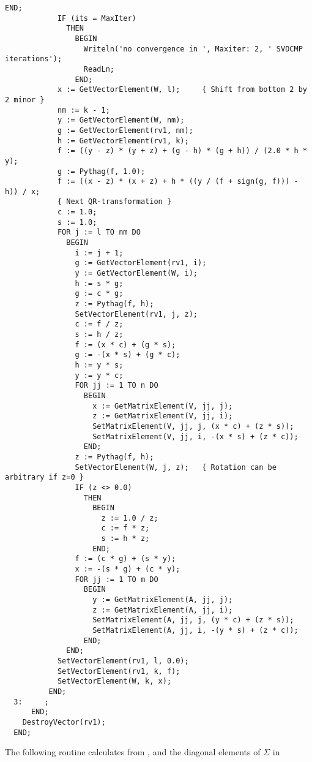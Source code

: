 \begin{lstlisting}[caption=Singular value decomposition]
                END;
            IF (its = MaxIter)
              THEN
                BEGIN
                  Writeln('no convergence in ', Maxiter: 2, ' SVDCMP iterations');
                  ReadLn;
                END;
            x := GetVectorElement(W, l);     { Shift from bottom 2 by 2 minor }
            nm := k - 1;
            y := GetVectorElement(W, nm);
            g := GetVectorElement(rv1, nm);
            h := GetVectorElement(rv1, k);
            f := ((y - z) * (y + z) + (g - h) * (g + h)) / (2.0 * h * y);
            g := Pythag(f, 1.0);
            f := ((x - z) * (x + z) + h * ((y / (f + sign(g, f))) - h)) / x;
            { Next QR-transformation }
            c := 1.0;
            s := 1.0;
            FOR j := l TO nm DO
              BEGIN
                i := j + 1;
                g := GetVectorElement(rv1, i);
                y := GetVectorElement(W, i);
                h := s * g;
                g := c * g;
                z := Pythag(f, h);
                SetVectorElement(rv1, j, z);
                c := f / z;
                s := h / z;
                f := (x * c) + (g * s);
                g := -(x * s) + (g * c);
                h := y * s;
                y := y * c;
                FOR jj := 1 TO n DO
                  BEGIN
                    x := GetMatrixElement(V, jj, j);
                    z := GetMatrixElement(V, jj, i);
                    SetMatrixElement(V, jj, j, (x * c) + (z * s));
                    SetMatrixElement(V, jj, i, -(x * s) + (z * c));
                  END;
                z := Pythag(f, h);
                SetVectorElement(W, j, z);   { Rotation can be arbitrary if z=0 }
                IF (z <> 0.0)
                  THEN
                    BEGIN
                      z := 1.0 / z;
                      c := f * z;
                      s := h * z;
                    END;
                f := (c * g) + (s * y);
                x := -(s * g) + (c * y);
                FOR jj := 1 TO m DO
                  BEGIN
                    y := GetMatrixElement(A, jj, j);
                    z := GetMatrixElement(A, jj, i);
                    SetMatrixElement(A, jj, j, (y * c) + (z * s));
                    SetMatrixElement(A, jj, i, -(y * s) + (z * c));
                  END;
              END;
            SetVectorElement(rv1, l, 0.0);
            SetVectorElement(rv1, k, f);
            SetVectorElement(W, k, x);
          END;
  3:     ;
      END;
    DestroyVector(rv1);
  END;
\end{lstlisting}

The following routine calculates  from ,  and the diagonal elements of \(\Sigma \) in 

